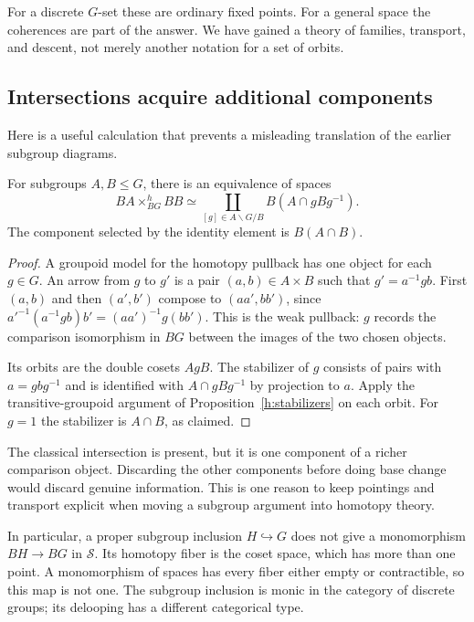 For a discrete $G$-set these are ordinary fixed points.  For a general
space the coherences are part of the answer.  We have gained a theory of
families, transport, and descent, not merely another notation for a set
of orbits.

\subsection{Intersections acquire additional components}

Here is a useful calculation that prevents a misleading translation of
the earlier subgroup diagrams.

\begin{proposition}
\label{h:double-coset}
For subgroups $A,B\leq G$, there is an equivalence of spaces
\[
 BA\times^h_{BG}BB
 \simeq
 \coprod_{[g]\in A\backslash G/B}
 B(A\cap gBg^{-1}).
\]
The component selected by the identity element is $B(A\cap B)$.
\end{proposition}
\begin{proof}
A groupoid model for the homotopy pullback has one object for each
$g\in G$.  An arrow from $g$ to $g'$ is a pair $(a,b)\in A\times B$
such that $g'=a^{-1}gb$.  First $(a,b)$ and then $(a',b')$ compose to
$(aa',bb')$, since $a'^{-1}(a^{-1}gb)b'=(aa')^{-1}g(bb')$.
This is the weak pullback: $g$ records the comparison isomorphism in
$BG$ between the images of the two chosen objects.

Its orbits are the double cosets $AgB$.  The stabilizer of $g$ consists
of pairs with $a=gbg^{-1}$ and is identified with $A\cap gBg^{-1}$ by
projection to $a$.  Apply the transitive-groupoid argument of
Proposition~\ref{h:stabilizers} on each orbit.  For $g=1$ the stabilizer
is $A\cap B$, as claimed.
\end{proof}

The classical intersection is present, but it is one component of a richer
comparison object.  Discarding the other components before doing base
change would discard genuine information.  This is one reason to keep
pointings and transport explicit when moving a subgroup argument into
homotopy theory.

In particular, a proper subgroup inclusion $H\hookrightarrow G$ does not
give a monomorphism $BH\to BG$ in $\mathcal S$.  Its homotopy fiber is the
coset space, which has more than one point.  A monomorphism of spaces has
every fiber either empty or contractible, so this map is not one.
The subgroup inclusion is monic in the category of discrete groups;
its delooping has a different categorical type.

